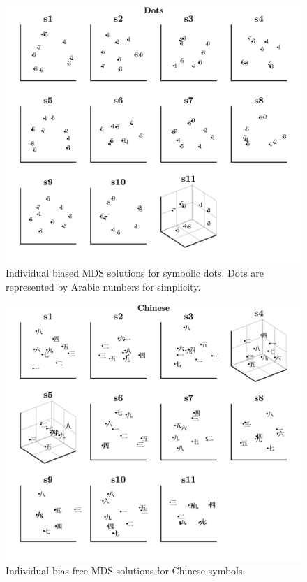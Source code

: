 \begin{figure}[tbh]
\centering \includegraphics[scale = .67]{Figures/Appendix/AppE/Biased_Indiv_MDS_2.jpg}
\caption{Individual biased MDS solutions for symbolic dots. Dots are represented by Arabic numbers for simplicity.}
\label{fig:Apx_MDSdotsBiased_Cross}
\end{figure}

\begin{figure}[tbh]
\centering \includegraphics[scale = .67]{Figures/Appendix/AppE/Biased_Indiv_MDS_3.jpg}
\caption{Individual bias-free MDS solutions for Chinese symbols.}
\label{fig:Apx_MDSchineseBiased_Cross}
\end{figure}

